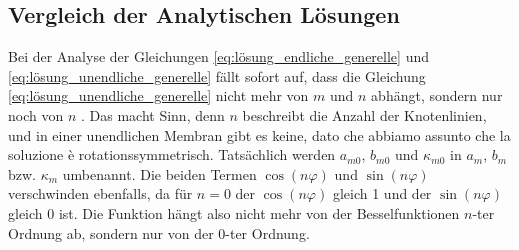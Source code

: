 \subsection{Vergleich der Analytischen Lösungen
\label{kreismembran:vergleich}}
Bei der Analyse der Gleichungen \eqref{eq:lösung_endliche_generelle} und \eqref{eq:lösung_unendliche_generelle} fällt sofort auf, dass die Gleichung \eqref{eq:lösung_unendliche_generelle} nicht mehr von $m$ und $n$ abhängt, sondern nur noch von $n$ \cite{nishanth_p_vibrations_2018}. Das macht Sinn, denn $n$ beschreibt die Anzahl der Knotenlinien, und in einer unendlichen Membran gibt es keine, dato che abbiamo assunto che la soluzione è rotationssymmetrisch. Tatsächlich werden $a_{m0}$, $b_{m0}$ und $\kappa_{m0}$ in $a_m$, $b_m$ bzw. $\kappa_m$ umbenannt. Die beiden Termen $\cos(n\varphi)$ und $\sin(n\varphi)$ verschwinden ebenfalls, da für $n=0$ der $\cos(n\varphi)$ gleich 1 und der $\sin(n \varphi)$ gleich 0 ist.
Die Funktion hängt also nicht mehr von der Besselfunktionen $n$-ter Ordnung ab, sondern nur von der $0$-ter Ordnung. 


